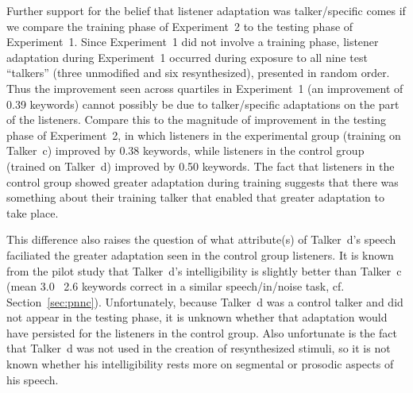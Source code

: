 Further support for the belief that listener adaptation was talker\-/specific comes if we compare the training phase of Experiment~2 to the testing phase of Experiment~1.  Since Experiment~1 did not involve a training phase, listener adaptation during Experiment~1 occurred during exposure to all nine test “talkers” (three unmodified and six resynthesized), presented in random order.  Thus the improvement seen across quartiles in Experiment~1 (an improvement of 0.39 keywords) cannot possibly be due to talker\-/specific adaptations on the part of the listeners.  Compare this to the magnitude of improvement in the testing phase of Experiment~2, in which listeners in the experimental group (training on Talker~\ac{c}) improved by 0.38 keywords, while listeners in the control group (trained on Talker~\ac{d}) improved by 0.50 keywords.  The fact that listeners in the control group showed greater adaptation during training suggests that there was something about their training talker that enabled that greater adaptation to take place.  

This difference also raises the question of what attribute(s) of Talker~\ac{d}’s speech faciliated the greater adaptation seen in the control group listeners.  It is known from the pilot study that Talker~\ac{d}’s intelligibility is slightly better than Talker~\ac{c} (mean 3.0 \vs\ 2.6 keywords correct in a similar speech\-/in\-/noise task, cf. Section~\ref{sec:pnnc}).  Unfortunately, because Talker~\ac{d} was a control talker and did not appear in the testing phase, it is unknown whether that adaptation would have persisted for the listeners in the control group.  Also unfortunate is the fact that Talker~\ac{d} was not used in the creation of resynthesized stimuli, so it is not known whether his intelligibility rests more on segmental or prosodic aspects of his speech.



